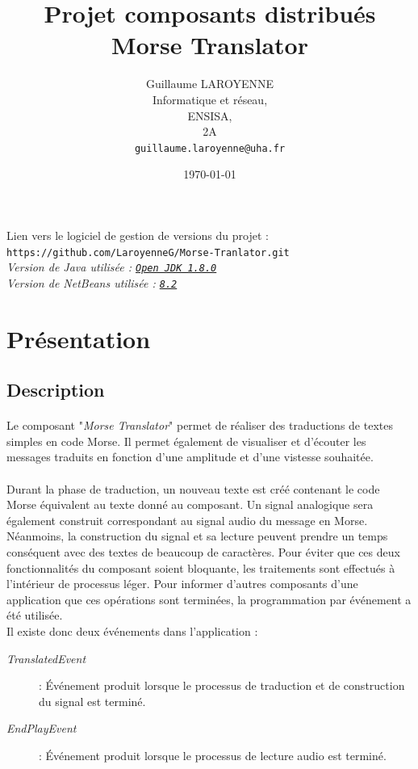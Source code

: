\documentclass[a4paper,11pt]{article}
\title{\LARGE{Projet composants distribués}\\\bigskip \textbf{Morse Translator}}
\author{Guillaume LAROYENNE\\
Informatique et réseau,\\
ENSISA,\\
2A\\
\bigskip
\texttt{guillaume.laroyenne@uha.fr}
}
\date{\today}
\begin{document}
    \maketitle
    \vspace{2cm}
    \begin{center}
        \large{Lien vers le logiciel de gestion de versions du projet :} \texttt{https://github.com/LaroyenneG/Morse-Tranlator.git}
        \\[2cm]
        \textit{Version de Java utilisée : \texttt{\underline{Open JDK 1.8.0}}}\\
        \textit{Version de NetBeans utilisée : \texttt{\underline{8.2}}}
    \end{center}

    \newpage

    \tableofcontents

    \newpage

    \section{Présentation}
    \subsection{Description}
    \paragraph{}
    Le composant "\textit{Morse Translator}" permet de réaliser des traductions de textes simples en code Morse. Il permet également de visualiser et d'écouter les messages traduits en fonction d'une amplitude et d'une vistesse souhaitée.
    \paragraph{}
    Durant la phase de traduction, un nouveau texte est créé contenant le code Morse équivalent au texte donné au composant. Un signal analogique sera également construit correspondant au signal audio du message en Morse. Néanmoins, la construction du signal et sa lecture peuvent prendre un temps conséquent avec des textes de beaucoup de caractères. Pour éviter que ces deux fonctionnalités du composant soient bloquante, les traitements sont effectués à l'intérieur de processus léger. Pour informer d'autres composants d'une application que ces opérations sont terminées, la programmation par événement a été utilisée.\\
    Il existe donc deux événements dans l'application :
    \begin{description}
        \item[\textit{TranslatedEvent}] : Événement produit lorsque le processus de traduction et de construction du signal est terminé.
        \item[\textit{EndPlayEvent}] : Événement produit lorsque le processus de lecture audio est terminé.
    \end{description}
\end{document}
